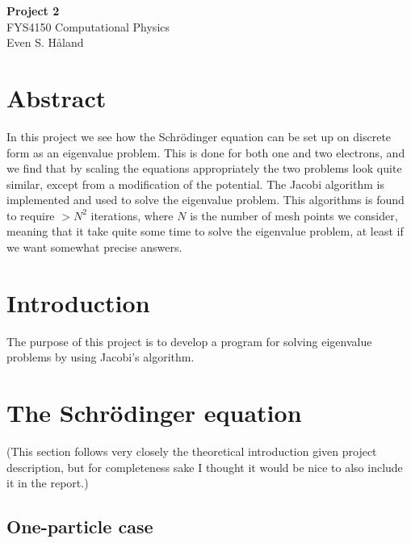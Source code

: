 \documentclass[12pt, a4paper]{article}
\begin{document}
\begin{titlepage}
\begin{center}
\vspace*{3cm}
\Huge
\textbf{Project 2} \\
\Large  
FYS4150 Computational Physics 
\vspace*{3cm} \\ 

Even S. Håland 
\vspace*{5cm} \\

\normalsize
\section*{Abstract}

In this project we see how the Schrödinger equation can be set up on discrete form as an eigenvalue
problem. This is done for both one and two electrons, and we find that by scaling the equations
appropriately the two problems look quite similar, except from a modification of the potential. The 
Jacobi algorithm is implemented and used to solve the eigenvalue problem. This algorithms is found to 
require $> N^2$ iterations, where $N$ is the number of mesh points we consider, meaning that it take 
quite some time to solve the eigenvalue problem, at least if we want somewhat precise answers. 

\end{center}
\end{titlepage}

\section{Introduction}

The purpose of this project is to develop a program for solving eigenvalue problems by using Jacobi's 
algorithm. 

\section{The Schrödinger equation}

(This section follows very closely the theoretical introduction given project description, but 
for completeness sake I thought it would be nice to also include it in the report.) 

\subsection{One-particle case}
\end{document}
